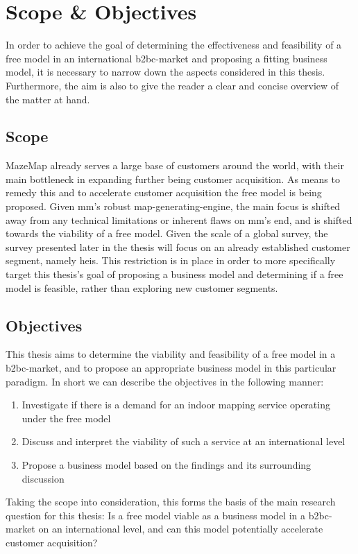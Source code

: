 \section{Scope \& Objectives}
In order to achieve the goal of determining the effectiveness and feasibility of a free model in an international \gls{b2bc}-market and proposing a fitting business model, it is necessary to narrow down the aspects considered in this thesis. Furthermore, the aim is also to give the reader a clear and concise overview of the matter at hand.

\subsection{Scope}
MazeMap already serves a large base of customers around the world, with their main bottleneck in expanding further being customer acquisition. As means to remedy this and to accelerate customer acquisition the free model is being proposed. Given \gls{mm}'s robust map-generating-engine, the main focus is shifted away from any technical limitations or inherent flaws on \gls{mm}'s end, and is shifted towards the viability of a free model. Given the scale of a global survey, the survey presented later in the thesis will focus on an already established customer segment, namely \gls{hei}s. This restriction is in place in order to more specifically target this thesis's goal of proposing a business model and determining if a free model is feasible, rather than exploring new customer segments. 

\subsection{Objectives}
This thesis aims to determine the viability and feasibility of a free model in a \gls{b2bc}-market, and to propose an appropriate business model in this particular paradigm. In short we can describe the objectives in the following manner:
\begin{enumerate}
    \item Investigate if there is a demand for an indoor mapping service operating under the free model 
    \item Discuss and interpret the viability of such a service at an international level
    \item Propose a business model based on the findings and its surrounding discussion
\end{enumerate}
Taking the scope into consideration, this forms the basis of the main research question for this thesis: Is a free model viable as a business model in a \gls{b2bc}-market on an international level, and can this model potentially accelerate customer acquisition?


